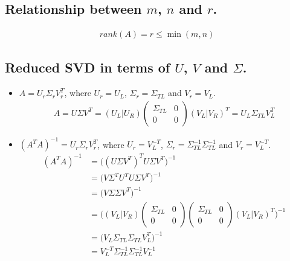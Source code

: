 \documentclass[11pt,a4paper]{article}
\begin{document}
\newpage
\section{}
\subsection{Relationship between $m$, $n$ and $r$.}
\begin{align}
    rank(A) = r \leq \min(m, n)
\end{align}

\subsection{Reduced SVD in terms of $U$, $V$ and $\Sigma$.}
\begin{itemize}
    \item $A = U_r \Sigma_r V_r^T$, where 
        $U_r = U_L$, $\Sigma_r = \Sigma_{TL}$ and $V_r = V_L$.
\begin{align}
    A = U\Sigma V^T 
    = (U_L | U_R) 
    \left( \begin{array}{c|c} \Sigma_{TL} & 0 \\ \hline 0 & 0 \end{array} \right)
    (V_L | V_R)^T
    = U_L \Sigma_{TL} V_L^T
\end{align}

    \item $(A^TA)^{-1} = U_r \Sigma_r V_r^T$, where 
        $U_r = V_L^{-T}$, $\Sigma_r = \Sigma_{TL}^{-1}\Sigma_{TL}^{-1}$ and $V_r = V_L^{-T}$.
\begin{align}
    (A^TA)^{-1} &= \big((U\Sigma V^T)^T  U\Sigma V^T \big)^{-1} \\
    &= \big(V \Sigma^T U^T U\Sigma V^T \big)^{-1}  \\
    &= \big(V \Sigma \Sigma V^T \big)^{-1}  \\
    &= \Bigg( (V_L | V_R) 
    \left( \begin{array}{c|c} \Sigma_{TL} & 0 \\ \hline 0 & 0 \end{array} \right)
    \left( \begin{array}{c|c} \Sigma_{TL} & 0 \\ \hline 0 & 0 \end{array} \right)
    (V_L | V_R)^T \Bigg)^{-1} \\
    &= \big( V_L \Sigma_{TL} \Sigma_{TL} V_L^{T} \big)^{-1}  \\
    &= V_L^{-T} \Sigma_{TL}^{-1} \Sigma_{TL}^{-1} V_L^{-1}  
\end{align}


\end{itemize}
\end{document}
